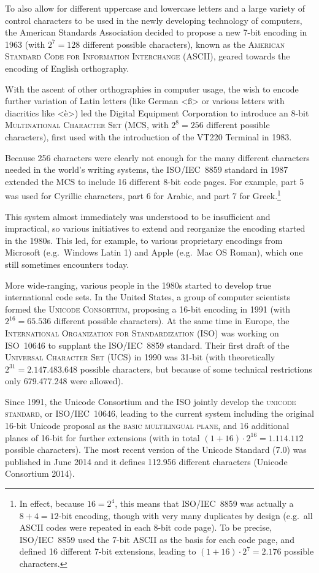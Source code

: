To also allow for different uppercase and lowercase letters and a large variety of control characters to be used in the newly developing technology of computers, the American Standards Association decided to propose a new 7-bit encoding in 1963 (with $2^7 = 128$ different possible characters), known as the \textsc{American Standard Code for Information Interchange} (ASCII), geared towards the encoding of English orthography. 

With the ascent of other orthographies in computer usage, the wish to encode further variation of Latin letters (like German <ß> or various letters with diacritics like <è>) led the Digital Equipment Corporation to introduce an 8-bit \textsc{Multinational Character Set} (MCS, with $2^8 = 256$ different possible characters), first used with the introduction of the {\small VT}220 Terminal in 1983. 

Because 256 characters were clearly not enough for the many different characters needed in the world's writing systems, the ISO/IEC~8859 standard in 1987 extended the MCS to include 16 different 8-bit code pages. For example, part 5 was used for Cyrillic characters, part 6 for Arabic, and part 7 for Greek.\footnote{In effect, because $16 = 2^4$, this means that ISO/IEC~8859 was actually a $8+4=12$-bit encoding, though with very many duplicates by design (e.g.~all ASCII codes were repeated in each 8-bit code page). To be precise, ISO/IEC~8859 used the 7-bit ASCII as the basis for each code page, and defined 16 different 7-bit extensions, leading to $(1+16)\cdot{2^7} = 2.176$ possible characters.}

This system almost immediately was understood to be insufficient and impractical, so various initiatives to extend and reorganize the encoding started in the 1980s. This led, for example, to various proprietary encodings from Microsoft (e.g.~Windows Latin 1) and Apple (e.g.~Mac OS Roman), which one still sometimes encounters today. 

More wide-ranging, various people in the 1980s started to develop true international code sets. In the United States, a group of computer scientists formed the \textsc{Unicode Consortium}, proposing a 16-bit encoding in 1991 (with $2^{16} = 65.536$ different possible characters). At the same time in Europe, the \textsc{International Organization for Standardization} (ISO) was working on ISO~10646 to supplant the ISO/IEC~8859 standard. Their first draft of the \textsc{Universal Character Set} (UCS) in 1990 was 31-bit (with theoretically $2^{31} = 2.147.483.648$ possible characters, but because of some technical restrictions only 679.477.248 were allowed). 

Since 1991, the Unicode Consortium and the ISO jointly develop the \textsc{unicode standard}, or ISO/IEC~10646, leading to the current system including the original 16-bit Unicode proposal as the \textsc{basic multilingual plane}, and 16 additional planes of 16-bit for further extensions (with in total $(1+16) \cdot 2^{16} = 1.114.112$ possible characters). The most recent version of the Unicode Standard (7.0) was published in June 2014 and it defines 112.956 different characters (Unicode Consortium 2014).